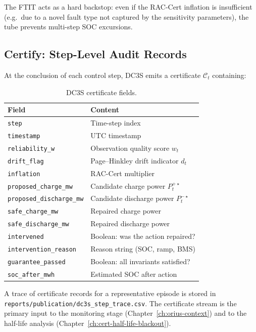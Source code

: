 The FTIT acts as a hard backstop: even if the RAC-Cert inflation is
insufficient (e.g.\ due to a novel fault type not captured by the
sensitivity parameters), the tube prevents multi-step SOC excursions.

\subsection{Certify: Step-Level Audit Records}
\label{sec:certify}

At the conclusion of each control step, DC3S emits a certificate
$\mathcal{C}_t$ containing:

\begin{table}[ht]
\centering
\caption{DC3S certificate fields.}
\label{tab:certificate-fields}
\begin{tabular}{ll}
\toprule
\textbf{Field} & \textbf{Content} \\
\midrule
\texttt{step}                    & Time-step index \\
\texttt{timestamp}               & UTC timestamp \\
\texttt{reliability\_w}          & Observation quality score $w_t$ \\
\texttt{drift\_flag}             & Page--Hinkley drift indicator $d_t$ \\
\texttt{inflation}               & RAC-Cert multiplier \\
\texttt{proposed\_charge\_mw}    & Candidate charge power $P_t^{+\star}$ \\
\texttt{proposed\_discharge\_mw} & Candidate discharge power $P_t^{-\star}$ \\
\texttt{safe\_charge\_mw}        & Repaired charge power \\
\texttt{safe\_discharge\_mw}     & Repaired discharge power \\
\texttt{intervened}              & Boolean: was the action repaired? \\
\texttt{intervention\_reason}    & Reason string (SOC, ramp, BMS) \\
\texttt{guarantee\_passed}       & Boolean: all invariants satisfied? \\
\texttt{soc\_after\_mwh}         & Estimated SOC after action \\
\bottomrule
\end{tabular}
\end{table}

A trace of certificate records for a representative episode is stored in
\texttt{reports/publication/dc3s\_step\_trace.csv}.  The certificate
stream is the primary input to the monitoring stage
(Chapter~\ref{ch:orius-context}) and to the half-life analysis
(Chapter~\ref{ch:cert-half-life-blackout}).

